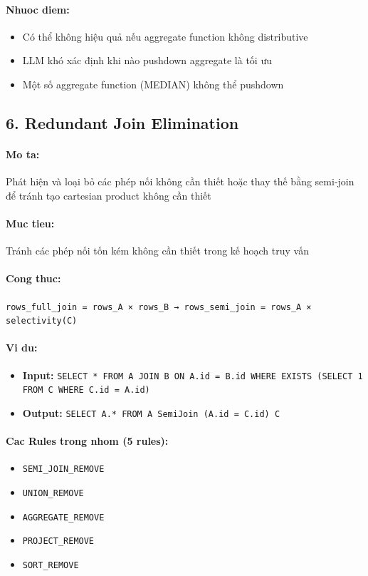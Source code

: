 \paragraph{Nhuoc diem:}
\begin{itemize}
\item Có thể không hiệu quả nếu aggregate function không distributive
\item LLM khó xác định khi nào pushdown aggregate là tối ưu
\item Một số aggregate function (MEDIAN) không thể pushdown
\end{itemize}
\newpage

\subsection*{\bfseries 6. Redundant Join Elimination}
\paragraph{Mo ta:} Phát hiện và loại bỏ các phép nối không cần thiết hoặc thay thế bằng semi-join để tránh tạo cartesian product không cần thiết
\paragraph{Muc tieu:} Tránh các phép nối tốn kém không cần thiết trong kế hoạch truy vấn
\paragraph{Cong thuc:} \texttt{rows_full_join = rows_A × rows_B → rows_semi_join = rows_A × selectivity(C)}
\paragraph{Vi du:}
\begin{itemize}
\item \textbf{Input:} \texttt{SELECT * FROM A JOIN B ON A.id = B.id WHERE EXISTS (SELECT 1 FROM C WHERE C.id = A.id)}
\item \textbf{Output:} \texttt{SELECT A.* FROM A SemiJoin (A.id = C.id) C}
\end{itemize}
\paragraph{Cac Rules trong nhom (5 rules):}
\begin{itemize}
\item \texttt{SEMI_JOIN_REMOVE}
\item \texttt{UNION_REMOVE}
\item \texttt{AGGREGATE_REMOVE}
\item \texttt{PROJECT_REMOVE}
\item \texttt{SORT_REMOVE}
\end{itemize}

